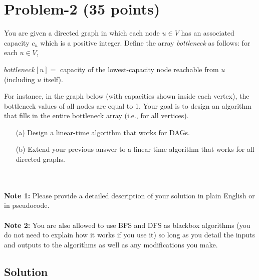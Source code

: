 \documentclass[11pt]{article}
\begin{document}
\newpage
\section*{Problem-2 (35 points)}
You are given a directed graph in which each node $u \in V$ has an associated capacity $c_u$ which is a positive integer. Define the array {\em bottleneck} as follows: for each $u \in V$,
\begin{center}
    $bottleneck[u] =$ capacity of the lowest-capacity node reachable from $u$ (including $u$ itself).
\end{center}
\noindent
For instance, in the graph below (with capacities shown inside each vertex), the bottleneck values of all nodes are equal to 1.
Your goal is to design an algorithm that fills in the entire bottleneck array (i.e., for all vertices). \\
\begin{center}
\end{center}

\begin{enumerate}
    \item[(a)] Design a linear-time algorithm that works for DAGs.
    \item[(b)] Extend your previous answer to a linear-time algorithm that works for all directed graphs.
\end{enumerate}
\\ \\
\textbf{Note 1:} Please provide a detailed description of your solution in plain English or in pseudocode. \\ \\
\textbf{Note 2:} You are also allowed to use BFS and DFS as blackbox algorithms (you do not need to explain how it works if you use it) so long as you detail the inputs and outputs to the algorithms as well as any modifications you make.​
\subsection*{Solution}
\end{document}
